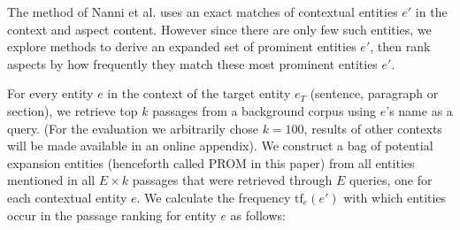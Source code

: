     
    
    

The method of Nanni et al. uses an exact matches of contextual entities $e'$ in the context and aspect content. However since there are only few such entities, we explore methods to derive an expanded set of prominent entities $e'$, then rank aspects by how frequently they match these most prominent entities $e'$. 

For every entity $e$ in the context of the target entity $e_T$ (sentence, paragraph or section), we retrieve top $k$ passages from a background corpus using $e$'s name as a query. (For the evaluation we arbitrarily chose $k=100$, results of other contexts will be made available in an online appendix). We construct a bag of potential expansion entities (henceforth called PROM in this paper) from all entities mentioned in all $E \times k$ passages that were retrieved through $E$ queries, one for each contextual entity $e$. We calculate the frequency $\text{tf}_{e}(e')$ with which entities occur in the passage ranking for entity $e$ as follows:

